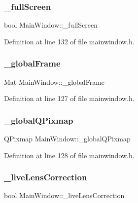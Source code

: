 \subsubsection{\texorpdfstring{\_fullScreen}{\_fullScreen}}
{\footnotesize\ttfamily bool Main\+Window\+::\+\_\+full\+Screen\hspace{0.3cm}{\ttfamily [private]}}



Definition at line 132 of file mainwindow.\+h.

\mbox{\label{class_main_window_a69d1e60b19121dcf294a0b3085c18b31}} 
\subsubsection{\texorpdfstring{\_globalFrame}{\_globalFrame}}
{\footnotesize\ttfamily Mat Main\+Window\+::\+\_\+global\+Frame\hspace{0.3cm}{\ttfamily [private]}}



Definition at line 127 of file mainwindow.\+h.

\mbox{\label{class_main_window_a9519bc24e6ce9e25bbfb4c9b71e34fb4}} 
\subsubsection{\texorpdfstring{\_globalQPixmap}{\_globalQPixmap}}
{\footnotesize\ttfamily Q\+Pixmap Main\+Window\+::\+\_\+global\+Q\+Pixmap\hspace{0.3cm}{\ttfamily [private]}}



Definition at line 128 of file mainwindow.\+h.

\mbox{\label{class_main_window_a7e80d766f1aecdcf4385f7d1b7fb0fa0}} 
\subsubsection{\texorpdfstring{\_liveLensCorrection}{\_liveLensCorrection}}
{\footnotesize\ttfamily bool Main\+Window\+::\+\_\+live\+Lens\+Correction\hspace{0.3cm}{\ttfamily [private]}}



